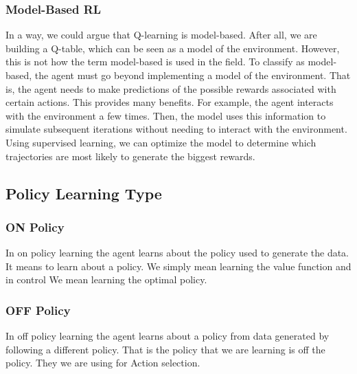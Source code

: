 \subsubsection{Model-Based RL}
In a way, we could argue that Q-learning is model-based. After all, we are building a Q-table, which can be seen as a model of the environment. However, this is not how the term model-based is used in the field.
To classify as model-based, the agent must go beyond implementing a model of the environment. That is, the agent needs to make predictions of the possible rewards associated with certain actions.
This provides many benefits. For example, the agent interacts with the environment a few times. Then, the model uses this information to simulate subsequent iterations without needing to interact with the environment.
Using supervised learning, we can optimize the model to determine which trajectories are most likely to generate the biggest rewards.

\subsection{Policy Learning Type}
\subsubsection{ON Policy}
In on policy learning the agent learns about the policy used to generate the data. It means to learn about a policy. We simply mean learning the value function and in control We mean learning the optimal policy.
\subsubsection{OFF Policy}
In off policy learning the agent learns about a policy from data generated by following a different policy. That is the policy that we are learning is off the policy. They we are using for Action selection. \\

